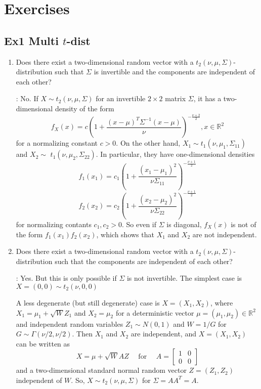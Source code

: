 \section{Exercises}
\subsection*{Ex1 Multi $t$-dist}
\begin{enumerate}[label = (\arabic*), leftmargin=*]
    \item Does there exist a two-dimensional random vector with a $t_{2}(\nu, \mu, \Sigma)$-distribution such that $\Sigma$ is invertible and the components are independent of each other?

: No. If $X \sim t_{2}(\nu, \mu, \Sigma)$ for an invertible $2 \times 2$ matrix $\Sigma$, it has a two-dimensional density of the form
$$
f_{X}(x)=c\left(1+\frac{(x-\mu)^{T} \Sigma^{-1}(x-\mu)}{\nu}\right)^{-\frac{\nu+2}{2}}, x \in \mathbb{R}^{2}
$$
for a normalizing constant $c>0$. On the other hand, $X_{1} \sim t_{1}\left(\nu, \mu_{1}, \Sigma_{11}\right)$ and $X_{2} \sim$ $t_{1}\left(\nu, \mu_{2}, \Sigma_{22}\right)$. In particular, they have one-dimensional densities
$$
f_{1}\left(x_{1}\right)=c_{1}\left(1+\frac{\left(x_{1}-\mu_{1}\right)^{2}}{\nu \Sigma_{11}}\right)^{-\frac{\nu+1}{2}}
$$
$$f_{2}\left(x_{2}\right)=c_{2}\left(1+\frac{\left(x_{2}-\mu_{2}\right)^{2}}{\nu \Sigma_{22}}\right)^{-\frac{\nu+1}{2}}$$
for normalizing contants $c_{1}, c_{2}>0$. So even if $\Sigma$ is diagonal, $f_{X}(x)$ is not of the form $f_{1}\left(x_{1}\right) f_{2}\left(x_{2}\right)$, which shows that $X_{1}$ and $X_{2}$ are not independent.



    \item Does there exist a two-dimensional random vector with a $t_{2}(\nu, \mu, \Sigma)$-distribution such that the components are independent of each other?

: Yes. But this is only possible if $\Sigma$ is not invertible. The simplest case is $X=(0,0) \sim t_{2}(\nu, 0,0)$

A less degenerate (but still degenerate) case is $X=\left(X_{1}, X_{2}\right)$, where $X_{1}=\mu_{1}+\sqrt{W} Z_{1}$ and $X_{2}=\mu_{2}$ for a deterministic vector $\mu=\left(\mu_{1}, \mu_{2}\right) \in \mathbb{R}^{2}$ and independent random variables $Z_{1} \sim N(0,1)$ and $W=1 / G$ for $G \sim \Gamma(\nu / 2, \nu / 2)$. Then $X_{1}$ and $X_{2}$ are independent, and $X=\left(X_{1}, X_{2}\right)$ can be written as
$$
X=\mu+\sqrt{W} A Z \quad \text { for } \quad A=\left[\begin{array}{ll}
1 & 0 \\
0 & 0
\end{array}\right]
$$
and a two-dimensional standard normal random vector $Z=\left(Z_{1}, Z_{2}\right)$ independent of $W$. So, $X \sim t_{2}(\nu, \mu, \Sigma)$ for $\Sigma=A A^{T}=A$.


\end{enumerate}
